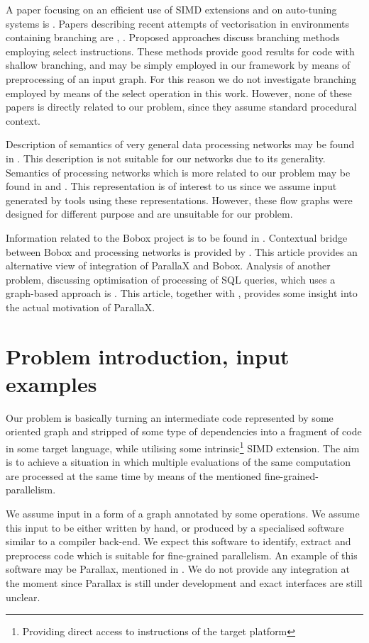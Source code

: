     A paper focusing on an efficient use of SIMD extensions and on auto-tuning systems is \cite{autotuning}. Papers describing recent attempts of vectorisation in environments containing branching are \cite{select}, \cite{select2}. Proposed approaches discuss branching methods employing select instructions. These methods provide good results for code with shallow branching, and may be simply employed in our framework by means of preprocessing of an input graph. For this reason we do not investigate branching employed by means of the select operation in this work. However, none of these papers is directly related to our problem, since they assume standard procedural context.
    
    Description of semantics of very general data processing networks may be found in \cite{kahn}. This description is not suitable for our networks due to its generality. Semantics of processing networks which is more related to our problem may be found in \cite{hfg} and \cite{dbnetworks}. This representation is of interest to us since we assume input generated by tools using these representations. However, these flow graphs were designed for different purpose and are unsuitable for our problem. 
    
    Information related to the Bobox project is to be found in \cite{bobox}. Contextual bridge between Bobox and processing networks is provided by \cite{pipelines}. This article provides an alternative view of integration of ParallaX and Bobox. Analysis of another problem, discussing optimisation of processing of SQL queries, which uses a graph-based approach is \cite{bindings}. This article, together with \cite{dbnetworks}, provides some insight into the actual motivation of ParallaX.

\section{Problem introduction, input examples}
\label{sec:problemintro}

Our problem is basically turning an intermediate code represented by some oriented graph and stripped of some type of dependencies into a fragment of code in some target language, while utilising some intrinsic\footnote{Providing direct access to instructions of the target platform} SIMD extension. The aim is to achieve a situation in which multiple evaluations of the same computation are processed at the same time by means of the mentioned fine-grained-parallelism. 

We assume input in a form of a graph annotated by some operations. We assume this input to be either written by hand, or produced by a specialised software similar to a compiler back-end. We expect this software to identify, extract and preprocess code which is suitable for fine-grained parallelism.  An example of this software may be Parallax, mentioned in \cite{pipelines}. We do not provide any integration at the moment since Parallax is still under development and exact interfaces are still unclear.


